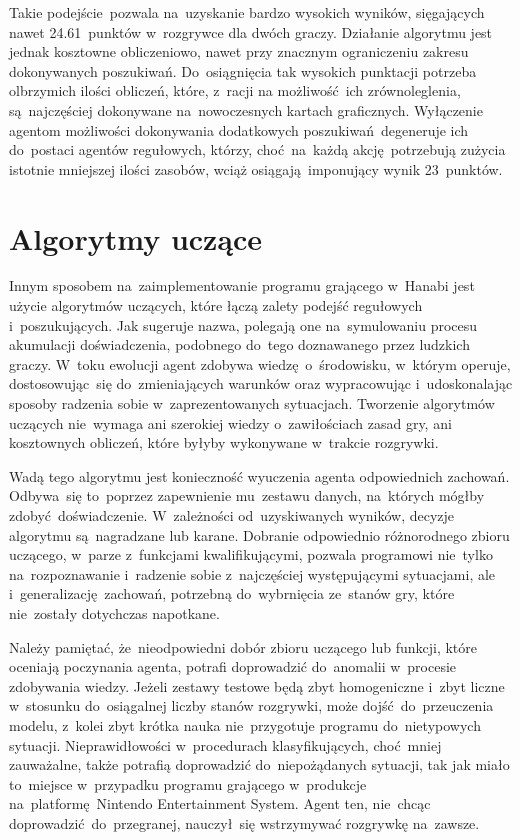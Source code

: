 \documentclass[declaration,shortabstract,inz]{iithesis}
\begin{document}
Takie podejście pozwala na~uzyskanie bardzo wysokich wyników, sięgających nawet 24.61~punktów w~rozgrywce dla dwóch graczy. Działanie algorytmu jest jednak kosztowne obliczeniowo, nawet przy znacznym ograniczeniu zakresu dokonywanych poszukiwań. Do~osiągnięcia tak wysokich punktacji potrzeba olbrzymich ilości obliczeń, które, z~racji na możliwość ich zrównoleglenia, są~najczęściej dokonywane na~nowoczesnych kartach graficznych. Wyłączenie agentom możliwości dokonywania dodatkowych poszukiwań degeneruje ich do~postaci agentów regułowych, którzy, choć na~każdą akcję potrzebują zużycia istotnie mniejszej ilości zasobów, wciąż osiągają imponujący wynik 23~punktów.

\section{Algorytmy uczące}

Innym sposobem na~zaimplementowanie programu grającego w~Hanabi jest użycie algorytmów uczących, które łączą zalety podejść regułowych i~poszukujących. Jak sugeruje nazwa, polegają one na~symulowaniu procesu akumulacji doświadczenia, podobnego do~tego doznawanego przez ludzkich graczy. W~toku ewolucji agent zdobywa wiedzę o~środowisku, w~którym operuje, dostosowując~się do~zmieniających warunków oraz wypracowując i~udoskonalając sposoby radzenia sobie w~zaprezentowanych sytuacjach. Tworzenie algorytmów uczących nie~wymaga ani szerokiej wiedzy o~zawiłościach zasad gry, ani kosztownych obliczeń, które byłyby wykonywane w~trakcie rozgrywki.

Wadą tego algorytmu jest konieczność wyuczenia agenta odpowiednich zachowań. Odbywa~się to~poprzez zapewnienie mu~zestawu danych, na~których mógłby zdobyć doświadczenie. W~zależności od~uzyskiwanych wyników, decyzje algorytmu są~nagradzane lub karane. Dobranie odpowiednio różnorodnego zbioru uczącego, w~parze z~funkcjami kwalifikującymi, pozwala programowi nie~tylko na~rozpoznawanie i~radzenie sobie z~najczęściej występującymi sytuacjami, ale i~generalizację zachowań, potrzebną do~wybrnięcia ze~stanów gry, które nie~zostały dotychczas napotkane.

Należy pamiętać, że~nieodpowiedni dobór zbioru uczącego lub funkcji, które oceniają poczynania agenta, potrafi doprowadzić do~anomalii w~procesie zdobywania wiedzy. Jeżeli zestawy testowe będą zbyt homogeniczne i~zbyt liczne w~stosunku do~osiągalnej liczby stanów rozgrywki, może dojść do~przeuczenia modelu, z~kolei zbyt krótka nauka nie~przygotuje programu do~nietypowych sytuacji. Nieprawidłowości w~procedurach klasyfikujących, choć mniej zauważalne, także potrafią doprowadzić do~niepożądanych sytuacji, tak jak miało to~miejsce w~przypadku programu grającego w~produkcje na~platformę Nintendo Entertainment System. Agent ten, nie~chcąc doprowadzić do~przegranej, nauczył~się wstrzymywać rozgrywkę na~zawsze\cite{Mario}.
\end{document}
